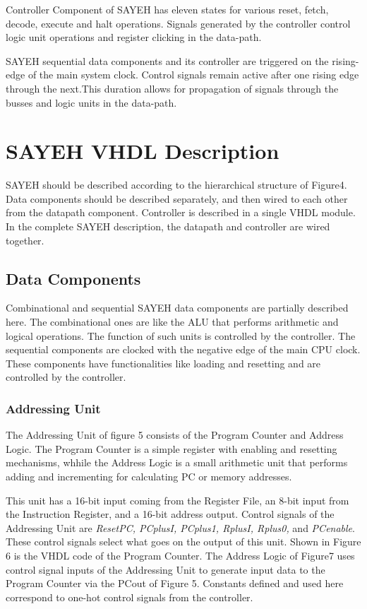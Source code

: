 \documentclass{report}
\begin{document}
\par
Controller Component of SAYEH has eleven states for various reset, fetch, decode, execute and halt operations. Signals generated by the controller control logic unit operations and register clicking in the data-path.
\par
SAYEH sequential data components and its controller are triggered on the rising-edge of the main system clock. Control signals remain active after one rising edge through the next.This duration allows for propagation of signals through the busses and logic units in the data-path.


\section{SAYEH VHDL Description}
SAYEH should be described according to the hierarchical structure of Figure4. Data components should be described separately, and then wired to each other from the datapath component. Controller is described in a single VHDL module. In the complete SAYEH description, the datapath and controller are wired together.
\subsection{Data Components}
Combinational and sequential SAYEH data components are partially described here. The combinational ones are like the ALU that performs arithmetic and logical operations. The function of such units is controlled by the controller. The sequential components are clocked with the negative edge of the main CPU clock. These components have functionalities like loading and resetting and are controlled by the controller.
\subsubsection{Addressing Unit}
The Addressing Unit of figure 5 consists of the Program Counter and Address Logic. The Program Counter is a simple register with enabling and resetting mechanisms, whhile the Address Logic is a small arithmetic unit that performs adding and incrementing for calculating PC or memory addresses.
\par
This unit has a 16-bit input coming from the Register File, an 8-bit input from the Instruction Register, and a 16-bit address output. Control signals of the Addressing Unit are \textit{ResetPC, PCplusI, PCplus1, RplusI, Rplus0,} and \textit{PCenable}. These control signals select what goes on the output of this unit. Shown in Figure 6 is the VHDL code of the Program Counter. The Address Logic of Figure7 uses control signal inputs of the Addressing Unit to generate input data to the Program Counter via the PCout of Figure 5. Constants defined and used here correspond to one-hot control signals from the controller.
\end{document}
